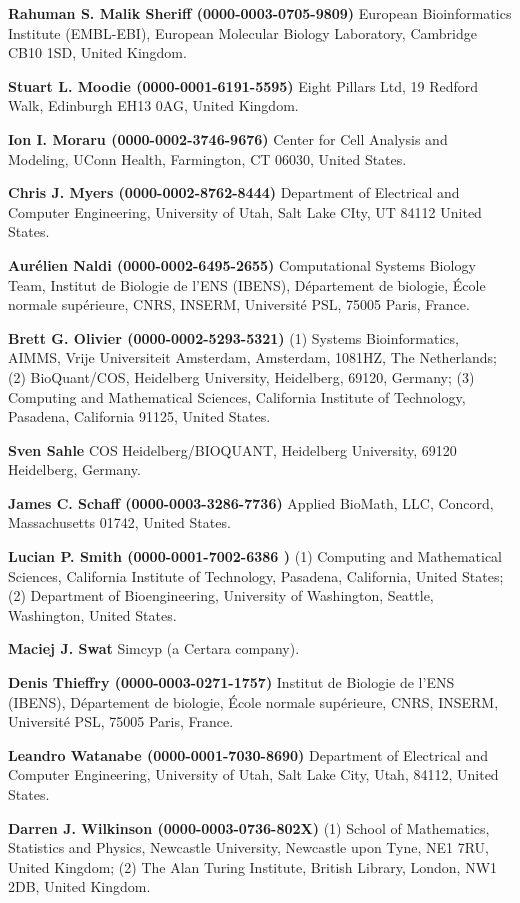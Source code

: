 \documentclass{sbml-paper}
\begin{document}
\textbf{Rahuman S. Malik Sheriff (0000-0003-0705-9809)} European Bioinformatics Institute (EMBL-EBI), European Molecular Biology Laboratory, Cambridge CB10 1SD, United Kingdom.

\textbf{Stuart L. Moodie (0000-0001-6191-5595)} Eight Pillars Ltd, 19 Redford Walk, Edinburgh EH13 0AG, United Kingdom.

\textbf{Ion I. Moraru (0000-0002-3746-9676)} Center for Cell Analysis and Modeling, UConn Health, Farmington, CT 06030, United States.

\textbf{Chris J. Myers (0000-0002-8762-8444)} Department of Electrical and Computer Engineering, University of Utah, Salt Lake CIty, UT 84112 United States.

\textbf{Aurélien Naldi (0000-0002-6495-2655)} Computational Systems Biology Team, Institut de Biologie de l’ENS (IBENS), Département de biologie, École normale supérieure, CNRS, INSERM, Université PSL, 75005 Paris, France.

\textbf{Brett G. Olivier (0000-0002-5293-5321)} (1) Systems Bioinformatics, AIMMS, Vrije Universiteit Amsterdam, Amsterdam, 1081HZ, The Netherlands; (2) BioQuant/COS, Heidelberg University, Heidelberg, 69120, Germany; (3) Computing and Mathematical Sciences, California Institute of Technology, Pasadena, California 91125, United States.

\textbf{Sven Sahle} COS Heidelberg/BIOQUANT,  Heidelberg University, 69120 Heidelberg, Germany.

\textbf{James C. Schaff (0000-0003-3286-7736)} Applied BioMath, LLC, Concord, Massachusetts 01742, United States.

\textbf{Lucian P. Smith (0000-0001-7002-6386 )} (1) Computing and Mathematical Sciences, California Institute of Technology, Pasadena, California, United States; (2) Department of Bioengineering, University of Washington, Seattle, Washington, United States.

\textbf{Maciej J. Swat} Simcyp (a Certara company).

\textbf{Denis Thieffry (0000-0003-0271-1757)} Institut de Biologie de l'ENS (IBENS), Département de biologie, École normale supérieure, CNRS, INSERM, Université PSL, 75005 Paris, France.

\textbf{Leandro Watanabe (0000-0001-7030-8690)} Department of Electrical and Computer Engineering,  University of Utah, Salt Lake City, Utah, 84112, United States.

\textbf{Darren J. Wilkinson (0000-0003-0736-802X)} (1) School of Mathematics, Statistics and Physics, Newcastle University, Newcastle upon Tyne, NE1 7RU, United Kingdom; (2) The Alan Turing Institute, British Library, London, NW1 2DB, United Kingdom.
\end{document}
